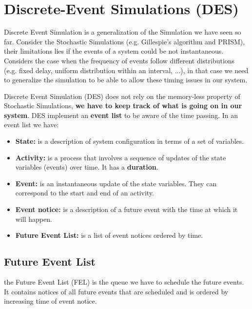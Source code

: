\chapter{Discrete-Event Simulations (DES)}

Discrete Event Simulation is a generalization of the Simulation we have seen so far. Consider the Stochastic Simulations (e.g. Gillespie's algorithm and PRISM), their limitations lies if the events of a system could be not instantaneous. Considers the case when the frequency of events follow different distributions (e.g. fixed delay, uniform distribution within an interval, ...), in that case we need to generalize the simulation to be able to allow these timing issues in our system. \par

Discrete Event Simulation (DES) does not rely on the memory-less property of Stochastic Simulations, \textbf{we have to keep track of what is going on in our system}. DES implement an \textbf{event list} to be aware of the time passing. In an event list we have:

\begin{itemize}
    \item \textbf{State:} is a description of system configuration in terms of a set of variables.
    \item \textbf{Activity:} is a process that involves a sequence of updates of the state variables (events) over time. It has a \textbf{duration}.
    \item \textbf{Event:} is an instantaneous update of the state variables. They can correspond to the start and end of an activity.
    \item \textbf{Event notice:} is a description of a future event with the time at which it will happen.
    \item \textbf{Future Event List:} is a list of event notices ordered by time.
\end{itemize}


\section{Future Event List}
the Future Event List (FEL) is the queue we have to schedule the future events. It contains notices of all future events that are scheduled and is ordered by increasing time of event notice.\par


